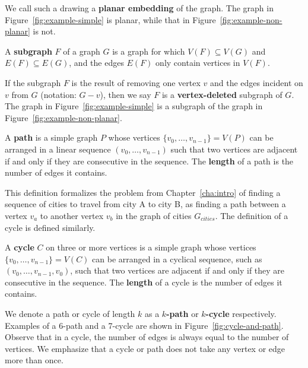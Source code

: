 We call such a drawing a \textbf{planar embedding} of the graph. The graph in Figure~\ref{fig:example-simple} is planar, while that in Figure~\ref{fig:example-non-planar} is not.

\begin{definition}[Subgraph]
  A \textbf{subgraph} $F$ of a graph $G$ is a graph for which $V(F) \subseteq V(G)$ and $E(F) \subseteq E(G)$, and the edges $E(F)$ only contain vertices in $V(F)$.
\end{definition}

If the subgraph $F$ is the result of removing one vertex $v$ and the edges incident on $v$ from $G$ (notation: $G - v$), then we say $F$ is a\textbf{ vertex-deleted} subgraph of $G$. The graph in Figure~\ref{fig:example-simple} is a subgraph of the graph in Figure~\ref{fig:example-non-planar}.

\begin{definition}[Path]
  A \textbf{path} is a simple graph $P$ whose vertices $\{v_0,\ldots, v_{n-1}\} = V(P)$ can be arranged in a linear sequence $(v_0,\ldots,v_{n-1})$ such that two vertices are adjacent if and only if they are consecutive in the sequence. The \textbf{length} of a path is the number of edges it contains.
\end{definition}

This definition formalizes the problem from Chapter~\ref{cha:intro} of finding a sequence of cities to travel from city A to city B, as finding a path between a vertex $v_a$ to another vertex $v_b$ in the graph of cities $G_\textit{cities}$. The definition of a cycle is defined similarly.

\begin{definition}[Cycle]
  A \textbf{cycle} $C$ on three or more vertices is a simple graph whose vertices $\{v_0,\ldots, v_{n-1}\} = V(C)$ can be arranged in a cyclical sequence, such as $(v_0, \ldots, v_{n-1}, v_0)$, such that two vertices are adjacent if and only if they are consecutive in the sequence. The \textbf{length} of a cycle is the number of edges it contains.
\end{definition}

We denote a path or cycle of length $k$ as a \textbf{$k$-path} or \textbf{$k$-cycle} respectively. Examples of a 6-path and a 7-cycle are shown in Figure~\ref{fig:cycle-and-path}. Observe that in a cycle, the number of edges is always equal to the number of vertices. We emphasize that a cycle or path does not take any vertex or edge more than once.

